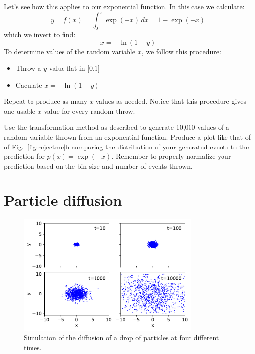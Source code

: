 Let's see how this applies to our exponential function.  In this case we calculate:
\begin{displaymath}
y = f(x) = \int_0^x \exp(-x) \, dx = 1 - \exp(-x)
\end{displaymath}  
which we invert to find:
\begin{displaymath}
x = - \ln(1-y)
\end{displaymath}  
To determine values of the random variable $x$, we follow this procedure:
\begin{itemize}
 \item Throw a $y$ value flat in [0,1]
 \item Caculate $x = -\ln(1-y)$
\end{itemize}
Repeat to produce as many $x$ values as needed.  Notice that this
procedure gives one usable $x$ value for every random throw.

\begin{plot} \end{plot}
Use the transformation method as described to generate 10,000 values
of a random variable thrown from an exponential function.  Produce a
plot like that of of Fig.~\ref{fig:rejectmc}b comparing the
distribution of your generated events to the prediction for $p(x) =
\exp(-x)$.  Remember to properly normalize your prediction based on
the bin size and number of events thrown.

\newpage
\section{Particle diffusion}

\begin{figure}[htbp]
\begin{center}
  \includegraphics[width=0.80\textwidth]{figs/monte_carlo/diffusion.pdf}
  \caption{Simulation of the diffusion of a drop of particles at four different times.}
\label{fig:diffusion}
\end{center}
\end{figure}

